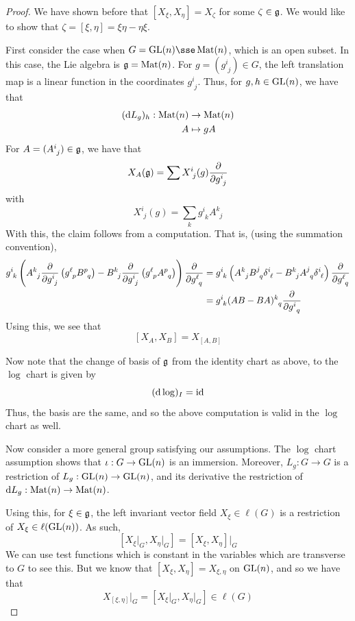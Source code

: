 \documentclass{article}
\begin{document}
\begin{proof}
    We have shown before that \([X_\xi, X_\eta] = X_\zeta\) for some \(\zeta \in \mathfrak{g}\). We would like to show that \(\zeta = [\xi, \eta] = \xi\eta - \eta\xi\).

    First consider the case when \(G = \GL(n) \sse \Mat(n)\), which is an open subset. In this case, the Lie algebra is \(\mathfrak{g} = \operatorname{Mat}(n)\). For \(g = (g^i_{\phantom{i}j}) \in G\), the left translation map is a linear function in the coordinates \(g^i_{\phantom{i}j}\). Thus, for \(g, h \in \operatorname{GL}(n)\), we have that
    \begin{align*}
        (\dd L_g)_h : \operatorname{Mat}(n) &\to \operatorname{Mat}(n) \\
        A &\mapsto gA
    \end{align*}
    For \(A = (A^i_{\phantom{i}j}) \in \mathfrak{g}\), we have that
    \[X_A(\mfg) = \sum X^i_{\phantom i j}(g)\pdv{g^i_{\phantom i j}}\]
    with
    \[X^i_{\phantom i j}(g) = \sum_k g^i_{\phantom i k}A^k_{\phantom k j}\]
    With this, the claim follows from a computation. That is, (using the summation convention),
    \begin{align*}
        g^i_{\phantom i k}\left(A^k_{\phantom k j}\pdv{g^i_{\phantom i j}}\left(g^\ell_{\phantom \ell p} B^p_{\phantom p q}\right) - B^k_{\phantom k j}\pdv{g^i_{\phantom i j}}\left(g^\ell_{\phantom \ell p} A^p_{\phantom p q}\right)\right) \pdv{g^\ell_{\phantom \ell q}}
        &= g^i_{\phantom i k}\left(A^k_{\phantom kj}B^j_{\phantom jq}\delta^i_{\phantom i\ell} - B^k_{\phantom kj}A^j_{\phantom jq}\delta^i_{\phantom i\ell}\right)\pdv{g^\ell_{\phantom \ell q}} \\
        &= g^i_{\phantom ik}(AB - BA)^k_{\phantom k q}\pdv{g^i_{\phantom j q}}
    \end{align*}
    Using this, we see that
    \[[X_A, X_B] = X_{[A, B]}\]

    Now note that the change of basis of \(\mathfrak{g}\) from the identity chart as above, to the \(\log\) chart is given by
    \[(\dd \log)_I = \operatorname{id}\]
    Thus, the basis are the same, and so the above computation is valid in the \(\log\) chart as well.

    Now consider a more general group satisfying our assumptions. The \(\log\) chart assumption shows that \(\iota : G \to \operatorname{GL}(n)\) is an immersion. Moreover, \(L_g : G \to G\) is a restriction of \(L_g : \operatorname{GL}(n) \to \operatorname{GL}(n)\), and its derivative the restriction of \(\dd L_g : \operatorname{Mat}(n) \to \operatorname{Mat}(n)\).

    Using this, for \(\xi \in \mathfrak{g}\), the left invariant vector field \(X_\xi \in \ell(G)\) is a restriction of \(X_\xi \in \ell(\operatorname{GL}(n))\). As such,
    \[[X_\xi\vert_G, X_\eta\vert_G] = [X_\xi, X_\eta]\vert_G\]
    We can use test functions which is constant in the variables which are transverse to \(G\) to see this. But we know that \([X_\xi, X_\eta] = X_{\xi, \eta}\) on \(\operatorname{GL}(n)\), and so we have that
    \[X_{[\xi, \eta]}\vert_G = [X_\xi\vert_G, X_\eta\vert_G] \in \ell(G)\]
\end{proof}
\end{document}
